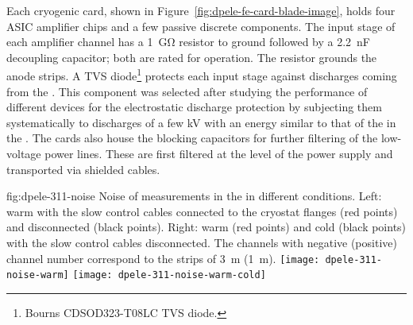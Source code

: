 Each cryogenic  card, shown in Figure~\ref{fig:dpele-fe-card-blade-image}, %
holds four ASIC amplifier chips and a few passive discrete components. The input stage of each amplifier channel has a \SI{1}{\giga\ohm} resistor to ground followed by a \SI{2.2}{\nano\farad} decoupling capacitor; both are rated for  operation. The %
resistor grounds the  anode strips. A TVS diode\footnote{Bourns\texttrademark{} CDSOD323-T08LC TVS diode.} protects each input stage against discharges coming from the . This component was selected after studying the performance of different devices for the electrostatic discharge protection by subjecting them systematically to discharges of a few \si{kV} with an energy similar to that of the  in the . The  cards also house the blocking capacitors for further filtering of the low-voltage power lines. These are first filtered at the level of the power supply and transported via shielded cables.

\begin{dunefigure}{fig:dpele-311-noise}
{Noise of measurements in the  in different conditions. Left: warm with the slow control cables connected to the cryostat flanges (red points) and disconnected (black points). Right: warm (red points) and cold (black points) with the slow control cables disconnected. The channels with negative (positive) channel number correspond to the strips of \SI{3}{\meter} (\SI{1}{\meter}).}
\texttt{[image: dpele-311-noise-warm]}
\texttt{[image: dpele-311-noise-warm-cold]}
\end{dunefigure}


